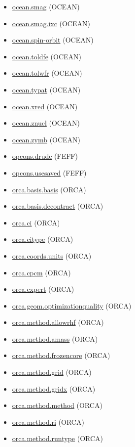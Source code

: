 \documentclass[11pt]{article}
\begin{document}
\begin{itemize}
\item \hyperref[kw:ocean-smag]{ocean.smag} (OCEAN)
\item \hyperref[kw:ocean-smag-ixc]{ocean.smag.ixc} (OCEAN)
\item \hyperref[kw:ocean-spin-orbit]{ocean.spin-orbit} (OCEAN)
\item \hyperref[kw:ocean-toldfe]{ocean.toldfe} (OCEAN)
\item \hyperref[kw:ocean-tolwfr]{ocean.tolwfr} (OCEAN)
\item \hyperref[kw:ocean-typat]{ocean.typat} (OCEAN)
\item \hyperref[kw:ocean-xred]{ocean.xred} (OCEAN)
\item \hyperref[kw:ocean-znucl]{ocean.znucl} (OCEAN)
\item \hyperref[kw:ocean-zymb]{ocean.zymb} (OCEAN)
\item \hyperref[kw:opcons-drude]{opcons.drude} (FEFF)
\item \hyperref[kw:opcons-usesaved]{opcons.usesaved} (FEFF)
\item \hyperref[kw:orca-basis-basis]{orca.basis.basis} (ORCA)
\item \hyperref[kw:orca-basis-decontract]{orca.basis.decontract} (ORCA)
\item \hyperref[kw:orca-ci]{orca.ci} (ORCA)
\item \hyperref[kw:orca-citype]{orca.citype} (ORCA)
\item \hyperref[kw:orca-coords-units]{orca.coords.units} (ORCA)
\item \hyperref[kw:orca-cpcm]{orca.cpcm} (ORCA)
\item \hyperref[kw:orca-expert]{orca.expert} (ORCA)
\item \hyperref[kw:orca-geom-optimizationquality]{orca.geom.optimizationquality} (ORCA)
\item \hyperref[kw:orca-method-allowrhf]{orca.method.allowrhf} (ORCA)
\item \hyperref[kw:orca-method-amass]{orca.method.amass} (ORCA)
\item \hyperref[kw:orca-method-frozencore]{orca.method.frozencore} (ORCA)
\item \hyperref[kw:orca-method-grid]{orca.method.grid} (ORCA)
\item \hyperref[kw:orca-method-gridx]{orca.method.gridx} (ORCA)
\item \hyperref[kw:orca-method-method]{orca.method.method} (ORCA)
\item \hyperref[kw:orca-method-ri]{orca.method.ri} (ORCA)
\item \hyperref[kw:orca-method-runtype]{orca.method.runtype} (ORCA)

\end{itemize}
\end{document}
